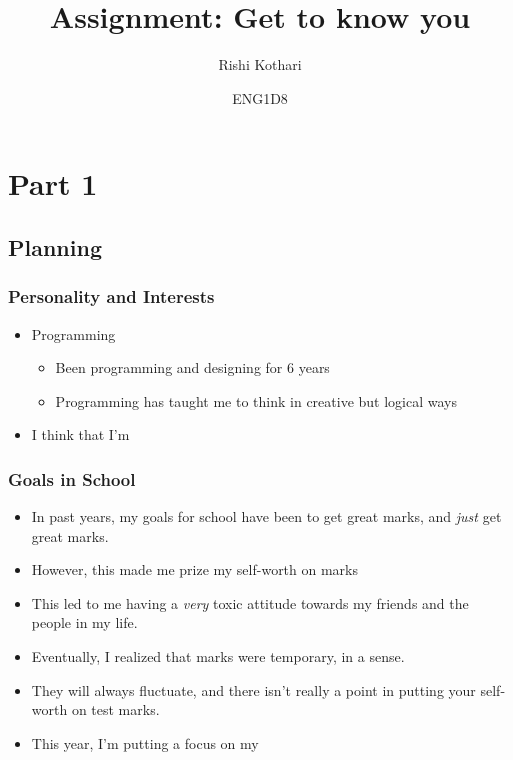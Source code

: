 \documentclass[]{article}
\title{\Huge Assignment: \textbf{Get to know you}}
\author{\LARGE Rishi Kothari}
\date{ENG1D8}
\begin{document}
\maketitle

\newpage


\section*{Part 1}
\subsection*{Planning}
\subsubsection*{Personality and Interests}
\begin{itemize}
    \item Programming
    \begin{itemize}
        \item Been programming and designing for 6 years
        \item Programming has taught me to think in creative but logical ways
    \end{itemize}
    \item I think that I'm 
\end{itemize}
\subsubsection*{Goals in School}
\begin{itemize}
    \item In past years, my goals for school have been to get great marks, and \textit{just} get great marks.
    \item However, this made me prize my self-worth on marks
    \item This led to me having a \textit{very} toxic attitude towards my friends and the people in my life.
    \item Eventually, I realized that marks were temporary, in a sense.
    \item They will always fluctuate, and there isn't really a point in putting your self-worth on test marks.
    \item This year, I'm putting a focus on my \textit{}
\end{itemize}
\end{document}

